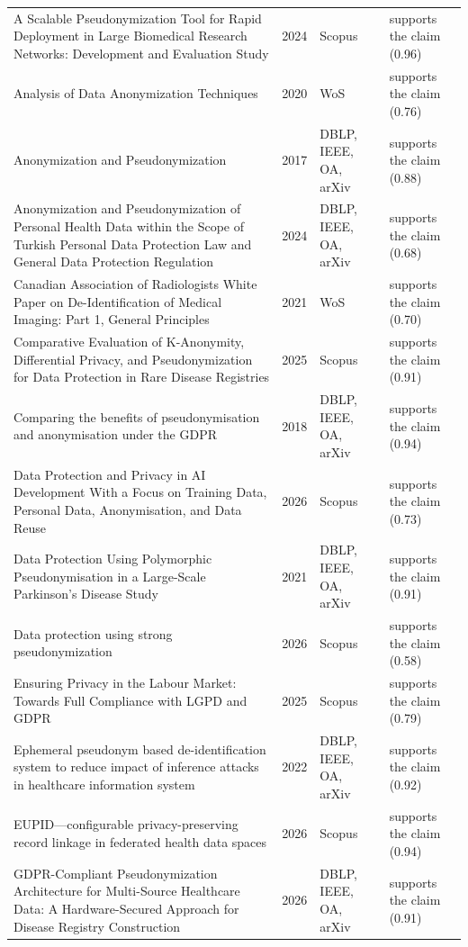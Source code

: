 \begin{longtable}{@{}%
  >{\raggedright\arraybackslash}p{}c%
  >{\raggedright\arraybackslash}p{}%
  >{\raggedright\arraybackslash}p{}@{}}
A Scalable Pseudonymization Tool for Rapid Deployment in Large Biomedical Research Networks: Development and Evaluation Study & 2024 & Scopus & supports the claim (0.96) \\
Analysis of Data Anonymization Techniques & 2020 & WoS & supports the claim (0.76) \\
Anonymization and Pseudonymization & 2017 & DBLP, IEEE, OA, arXiv & supports the claim (0.88) \\
Anonymization and Pseudonymization of Personal Health Data within the Scope of Turkish Personal Data Protection Law and General Data Protection Regulation & 2024 & DBLP, IEEE, OA, arXiv & supports the claim (0.68) \\
Canadian Association of Radiologists White Paper on De-Identification of Medical Imaging: Part 1, General Principles & 2021 & WoS & supports the claim (0.70) \\
Comparative Evaluation of K-Anonymity, Differential Privacy, and Pseudonymization for Data Protection in Rare Disease Registries & 2025 & Scopus & supports the claim (0.91) \\
Comparing the benefits of pseudonymisation and anonymisation under the GDPR & 2018 & DBLP, IEEE, OA, arXiv & supports the claim (0.94) \\
Data Protection and Privacy in AI Development With a Focus on Training Data, Personal Data, Anonymisation, and Data Reuse & 2026 & Scopus & supports the claim (0.73) \\
Data Protection Using Polymorphic Pseudonymisation in a Large-Scale Parkinson's Disease Study & 2021 & DBLP, IEEE, OA, arXiv & supports the claim (0.91) \\
Data protection using strong pseudonymization & 2026 & Scopus & supports the claim (0.58) \\
Ensuring Privacy in the Labour Market: Towards Full Compliance with LGPD and GDPR & 2025 & Scopus & supports the claim (0.79) \\
Ephemeral pseudonym based de-identification system to reduce impact of inference attacks in healthcare information system & 2022 & DBLP, IEEE, OA, arXiv & supports the claim (0.92) \\
EUPID---configurable privacy-preserving record linkage in federated health data spaces & 2026 & Scopus & supports the claim (0.94) \\
GDPR-Compliant Pseudonymization Architecture for Multi-Source Healthcare Data: A Hardware-Secured Approach for Disease Registry Construction & 2026 & DBLP, IEEE, OA, arXiv & supports the claim (0.91) \\

\end{longtable}
